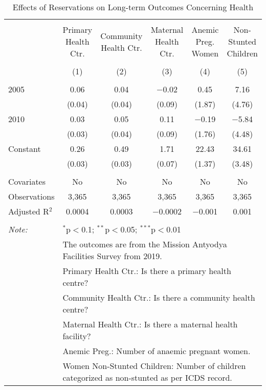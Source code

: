 
\begin{sidewaystable}[!htbp] \centering 
  \caption{Effects of Reservations on Long-term Outcomes Concerning Health} 
  \label{raj_shrug_health_05_10} 
\scriptsize 
\begin{tabular}{@{\extracolsep{0pt}}lccccc} 
\\[-1.8ex]\hline 
\hline \\[-1.8ex] 
 & Primary Health Ctr. & Community Health Ctr. & Maternal Health Ctr. & Anemic Preg. Women & Non-Stunted Children \\ 
\\[-1.8ex] & (1) & (2) & (3) & (4) & (5)\\ 
\hline \\[-1.8ex] 
 2005 & 0.06 & 0.04 & $-$0.02 & 0.45 & 7.16 \\ 
  & (0.04) & (0.04) & (0.09) & (1.87) & (4.76) \\ 
  2010 & 0.03 & 0.05 & 0.11 & $-$0.19 & $-$5.84 \\ 
  & (0.03) & (0.04) & (0.09) & (1.76) & (4.48) \\ 
  Constant & 0.26 & 0.49 & 1.71 & 22.43 & 34.61 \\ 
  & (0.03) & (0.03) & (0.07) & (1.37) & (3.48) \\ 
 \hline \\[-1.8ex] 
Covariates & No & No & No & No & No \\ 
Observations & 3,365 & 3,365 & 3,365 & 3,365 & 3,365 \\ 
Adjusted R$^{2}$ & 0.0004 & 0.0003 & $-$0.0002 & $-$0.001 & 0.001 \\ 
\hline 
\hline \\[-1.8ex] 
\textit{Note:}  & \multicolumn{5}{l}{$^{*}$p$<$0.1; $^{**}$p$<$0.05; $^{***}$p$<$0.01} \\ 
 & \multicolumn{5}{l}{The outcomes are from the Mission Antyodya Facilities Survey from 2019.} \\ 
 & \multicolumn{5}{l}{Primary Health Ctr.: Is there a primary health centre?} \\ 
 & \multicolumn{5}{l}{Community Health Ctr.: Is there a community health centre?} \\ 
 & \multicolumn{5}{l}{Maternal Health Ctr.: Is there a maternal health facility?} \\ 
 & \multicolumn{5}{l}{Anemic Preg.: Number of anaemic pregnant women.} \\ 
 & \multicolumn{5}{l}{Women Non-Stunted Children: Number of children categorized as non-stunted as per ICDS record.} \\ 
\end{tabular} 
\end{sidewaystable} 
